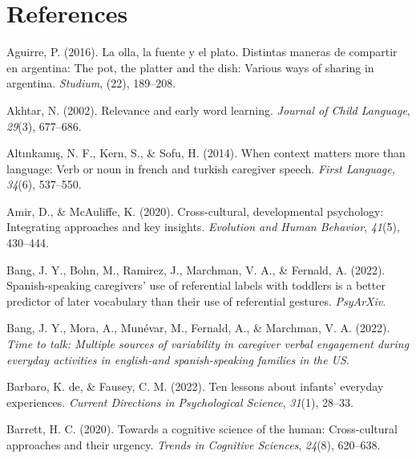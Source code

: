 \documentclass[
  man,floatsintext]{apa6}
\newlength{\cslhangindent}
\newlength{\cslentryspacingunit} %
\newenvironment{CSLReferences}[2] %
 {%
  \setlength{\parindent}{0pt}
  \ifodd #1
  \let\oldpar\par
  \def\par{\hangindent=\cslhangindent\oldpar}
  \fi
  \setlength{\parskip}{#2\cslentryspacingunit}
 }%
 {}
\begin{document}
\newpage

\hypertarget{references}{%
\section{References}\label{references}}

\hypertarget{refs}{}
\begin{CSLReferences}{1}{0}
\leavevmode{}%
Aguirre, P. (2016). La olla, la fuente y el plato. Distintas maneras de compartir en argentina: The pot, the platter and the dish: Various ways of sharing in argentina. \emph{Studium}, (22), 189--208.

\leavevmode{}%
Akhtar, N. (2002). Relevance and early word learning. \emph{Journal of Child Language}, \emph{29}(3), 677--686.

\leavevmode{}%
Altınkamış, N. F., Kern, S., \& Sofu, H. (2014). When context matters more than language: Verb or noun in french and turkish caregiver speech. \emph{First Language}, \emph{34}(6), 537--550.

\leavevmode{}%
Amir, D., \& McAuliffe, K. (2020). Cross-cultural, developmental psychology: Integrating approaches and key insights. \emph{Evolution and Human Behavior}, \emph{41}(5), 430--444.

\leavevmode{}%
Bang, J. Y., Bohn, M., Ramirez, J., Marchman, V. A., \& Fernald, A. (2022). Spanish-speaking caregivers' use of referential labels with toddlers is a better predictor of later vocabulary than their use of referential gestures. \emph{PsyArXiv}.

\leavevmode{}%
Bang, J. Y., Mora, A., Munévar, M., Fernald, A., \& Marchman, V. A. (2022). \emph{Time to talk: Multiple sources of variability in caregiver verbal engagement during everyday activities in english-and spanish-speaking families in the US}.

\leavevmode{}%
Barbaro, K. de, \& Fausey, C. M. (2022). Ten lessons about infants' everyday experiences. \emph{Current Directions in Psychological Science}, \emph{31}(1), 28--33.

\leavevmode{}%
Barrett, H. C. (2020). Towards a cognitive science of the human: Cross-cultural approaches and their urgency. \emph{Trends in Cognitive Sciences}, \emph{24}(8), 620--638.


\end{CSLReferences}
\end{document}
